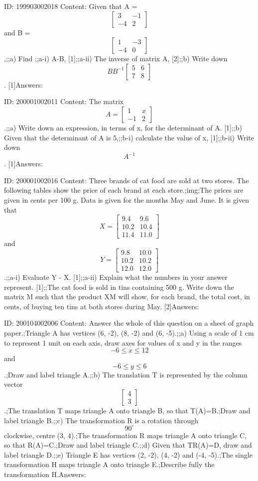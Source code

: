 \documentclass{article}
\begin{document}
ID: 199903002018
Content:
Given that A = $$\begin{bmatrix}3&-1\\-4&2\end{bmatrix}$$ and B = $$\begin{bmatrix}1&-3\\-4&0\end{bmatrix}$$,;;a) Find ;;a-i) A-B, [1];;a-ii) The inverse of matrix A, [2];;b) Write down $$BB^{-1} \begin{bmatrix}5&6\\7&8\end{bmatrix}$$. [1]Answers:

ID: 200001002011
Content:
The matrix $$A=\begin{bmatrix}1&x\\-1&2\end{bmatrix}$$.;;a) Write down an expression, in terms of x, for the determinant of A. [1];;b) Given that the determinant of A is 5,;;b-i) calculate the value of x, [1];;b-ii) Write down $$A^{-1}$$. [1]Answers:

ID: 200001002016
Content:
Three brands of cat food are sold at two stores. The following tables show the price of each brand at each store.;img;The prices are given in cents per 100 g. Data is given for the months May and June. It is given that $$X=\begin{bmatrix}9.4&9.6\\10.2&10.4\\11.4&11.0\end{bmatrix}$$ and $$Y=\begin{bmatrix}9.8&10.0\\10.2&10.2\\12.0&12.0\end{bmatrix}$$.;;a-i) Evaluate Y - X. [1];;a-ii) Explain what the numbers in your answer represent. [1];;The cat food is sold in tins containing 500 g. Write down the matrix M such that the product XM will show, for each brand, the total cost, in cents, of buying ten tins at both stores during May. [2]Answers:

ID: 200104002006
Content:
Answer the whole of this question on a sheet of graph paper.;Triangle A has vertices (6, -2), (8, -2) and (6, -5).;;a) Using a scale of 1 cm to represent 1 unit on each axis, draw axes for values of x and y in the ranges $$-6 \leq x \leq 12$$ and $$-6 \leq y \leq 6$$.;Draw and label triangle A.;;b) The translation T is represented by the column vector $$\begin{bmatrix}4\\3\end{bmatrix}$$.;The translation T maps triangle A onto triangle B, so that T(A)=B.;Draw and label triangle B.;;c) The transformation R is a rotation through $$90^{\circ}$$ clockwise, centre (3, 4).;The transformation R maps triangle A onto triangle C, so that R(A)=C.;Draw and label triangle C.;;d) Given that TR(A)=D, draw and label triangle D.;;e) Triangle E has vertices (2, -2), (4, -2) and (-4, -5).;The single transformation H maps triangle A onto triangle E.;Describe fully the transformation H.Answers:
\end{document}

